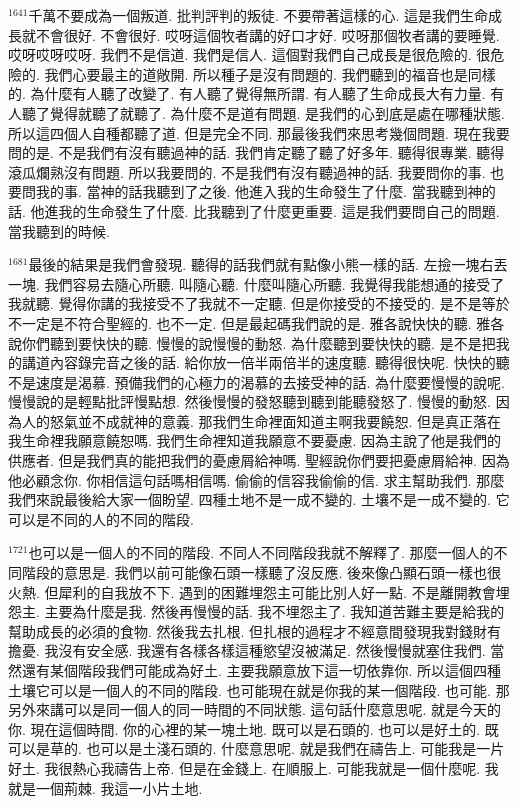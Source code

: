 \documentclass{book}
\begin{document}
$^{1641}$千萬不要成為一個叛道.
批判評判的叛徒.
不要帶著這樣的心.
這是我們生命成長就不會很好.
不會很好.
哎呀這個牧者講的好口才好.
哎呀那個牧者講的要睡覺.
哎呀哎呀哎呀.
我們不是信道.
我們是信人.
這個對我們自己成長是很危險的.
很危險的.
我們心要最主的道敞開.
所以種子是沒有問題的.
我們聽到的福音也是同樣的.
為什麼有人聽了改變了.
有人聽了覺得無所謂.
有人聽了生命成長大有力量.
有人聽了覺得就聽了就聽了.
為什麼不是道有問題.
是我們的心到底是處在哪種狀態.
所以這四個人自種都聽了道.
但是完全不同.
那最後我們來思考幾個問題.
現在我要問的是.
不是我們有沒有聽過神的話.
我們肯定聽了聽了好多年.
聽得很專業.
聽得滾瓜爛熟沒有問題.
所以我要問的.
不是我們有沒有聽過神的話.
我要問你的事.
也要問我的事.
當神的話我聽到了之後.
他進入我的生命發生了什麼.
當我聽到神的話.
他進我的生命發生了什麼.
比我聽到了什麼更重要.
這是我們要問自己的問題.
當我聽到的時候.

$^{1681}$最後的結果是我們會發現.
聽得的話我們就有點像小熊一樣的話.
左撿一塊右丟一塊.
我們容易去隨心所聽.
叫隨心聽.
什麼叫隨心所聽.
我覺得我能想通的接受了我就聽.
覺得你講的我接受不了我就不一定聽.
但是你接受的不接受的.
是不是等於不一定是不符合聖經的.
也不一定.
但是最起碼我們說的是.
雅各說快快的聽.
雅各說你們聽到要快快的聽.
慢慢的說慢慢的動怒.
為什麼聽到要快快的聽.
是不是把我的講道內容錄完音之後的話.
給你放一倍半兩倍半的速度聽.
聽得很快呢.
快快的聽不是速度是渴慕.
預備我們的心極力的渴慕的去接受神的話.
為什麼要慢慢的說呢.
慢慢說的是輕點批評慢點想.
然後慢慢的發怒聽到聽到能聽發怒了.
慢慢的動怒.
因為人的怒氣並不成就神的意義.
那我們生命裡面知道主啊我要饒恕.
但是真正落在我生命裡我願意饒恕嗎.
我們生命裡知道我願意不要憂慮.
因為主說了他是我們的供應者.
但是我們真的能把我們的憂慮屑給神嗎.
聖經說你們要把憂慮屑給神.
因為他必顧念你.
你相信這句話嗎相信嗎.
偷偷的信容我偷偷的信.
求主幫助我們.
那麼我們來說最後給大家一個盼望.
四種土地不是一成不變的.
土壤不是一成不變的.
它可以是不同的人的不同的階段.

$^{1721}$也可以是一個人的不同的階段.
不同人不同階段我就不解釋了.
那麼一個人的不同階段的意思是.
我們以前可能像石頭一樣聽了沒反應.
後來像凸顯石頭一樣也很火熱.
但犀利的自我放不下.
遇到的困難埋怨主可能比別人好一點.
不是離開教會埋怨主.
主要為什麼是我.
然後再慢慢的話.
我不埋怨主了.
我知道苦難主要是給我的幫助成長的必須的食物.
然後我去扎根.
但扎根的過程才不經意間發現我對錢財有擔憂.
我沒有安全感.
我還有各樣各樣這種慾望沒被滿足.
然後慢慢就塞住我們.
當然還有某個階段我們可能成為好土.
主要我願意放下這一切依靠你.
所以這個四種土壤它可以是一個人的不同的階段.
也可能現在就是你我的某一個階段.
也可能.
那另外來講可以是同一個人的同一時間的不同狀態.
這句話什麼意思呢.
就是今天的你.
現在這個時間.
你的心裡的某一塊土地.
既可以是石頭的.
也可以是好土的.
既可以是草的.
也可以是土淺石頭的.
什麼意思呢.
就是我們在禱告上.
可能我是一片好土.
我很熱心我禱告上帝.
但是在金錢上.
在順服上.
可能我就是一個什麼呢.
我就是一個荊棘.
我這一小片土地.
\end{document}

